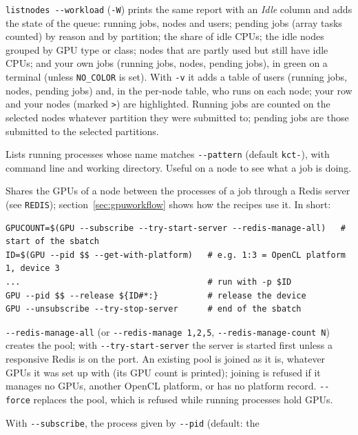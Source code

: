 \documentclass[11pt,a4paper]{article}
\newcommand{\cmd}[1]{\texttt{#1}}
\begin{document}
\begin{description}[style=nextline,leftmargin=1.5em]
    \cmd{listnodes -{}-workload} (\cmd{-W}) prints the same report with an \emph{Idle} column and
    adds the state of the queue: running jobs, nodes and users; pending jobs (array tasks
    counted) by reason and by partition; the share of idle CPUs; the idle nodes grouped by GPU type
    or class; nodes that are partly used but still have idle CPUs; and your own jobs (running jobs,
    nodes, pending jobs), in green on a terminal (unless \cmd{NO\_COLOR} is set). With \cmd{-v} it adds a table
    of users (running jobs, nodes, pending jobs) and, in the per-node table, who runs on each node;
    your row and your nodes (marked \cmd{>}) are highlighted.
    Running jobs are counted on the selected nodes whatever partition they were submitted to;
    pending jobs are those submitted to the selected partitions.
  \item[\cmd{kct-list}] Lists running processes whose name matches \cmd{-{}-pattern} (default
    \cmd{kct-}), with command line and working directory. Useful on a node to see what a job
    is doing.
  \item[\cmd{GPU}] Shares the GPUs of a node between the processes of a job through a Redis server
    (see \cmd{REDIS}); section~\ref{sec:gpuworkflow} shows how the recipes use it. In short:
\begin{lstlisting}
GPUCOUNT=$(GPU --subscribe --try-start-server --redis-manage-all)   # start of the sbatch
ID=$(GPU --pid $$ --get-with-platform)   # e.g. 1:3 = OpenCL platform 1, device 3
...                                      # run with -p $ID
GPU --pid $$ --release ${ID#*:}          # release the device
GPU --unsubscribe --try-stop-server      # end of the sbatch
\end{lstlisting}
    \begin{description}[style=nextline,leftmargin=1.5em,itemsep=2pt]
      \item[Setting up] \cmd{-{}-redis-manage-all} (or \cmd{-{}-redis-manage 1,2,5},
        \cmd{-{}-redis-manage-count N}) creates the pool; with \cmd{-{}-try-start-server} the server is
        started first unless a responsive Redis is on the port. An existing pool is joined as it is,
        whatever GPUs it was set up with (its GPU count is printed); joining is refused if it
        manages no GPUs, another OpenCL platform, or has no platform record. \cmd{-{}-force}
        replaces the pool, which is refused while running processes hold GPUs.
      \item[Subscribers] With \cmd{-{}-subscribe}, the process given by \cmd{-{}-pid} (default: the

\end{description}
\end{description}
\end{document}
